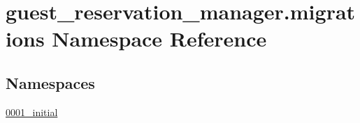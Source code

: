 \hypertarget{namespaceguest__reservation__manager_1_1migrations}{\section{guest\-\_\-reservation\-\_\-manager.\-migrations Namespace Reference}
\label{namespaceguest__reservation__manager_1_1migrations}
}
\subsection*{Namespaces}
\begin{DoxyCompactItemize}
\item 
\hyperlink{namespaceguest__reservation__manager_1_1migrations_1_10001__initial}{0001\-\_\-initial}
\end{DoxyCompactItemize}
